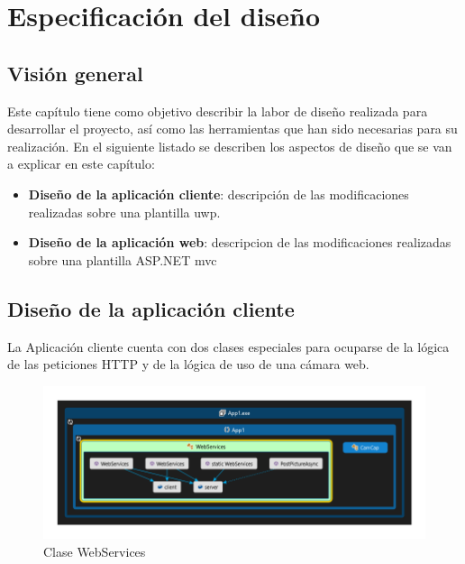 \chapter{Especificación del diseño}\label{chap:design}

\section{Visión general}

Este capítulo tiene como objetivo describir la labor de diseño realizada para desarrollar el proyecto, así como las herramientas que han sido necesarias para su realización. En el siguiente listado se describen los aspectos de diseño que se van a explicar en este capítulo:

\begin{itemize}
	\item \textbf{Diseño de la aplicación cliente}: descripción de las modificaciones realizadas sobre una plantilla \acrshort{uwp}.
	\item \textbf{Diseño de la aplicación web}: descripcion de las modificaciones realizadas sobre una plantilla ASP.NET \acrshort{mvc}

\end{itemize}

\section{Diseño de la aplicación cliente}

La Aplicación cliente cuenta con dos clases especiales para ocuparse de la lógica de las peticiones HTTP y de la lógica de uso de una cámara web.

\begin{figure}[!htbp]
	\centering
	\includegraphics[angle=90, scale=1.0]{fig/WebServices}
	\caption{Clase WebServices}
\end{figure}



